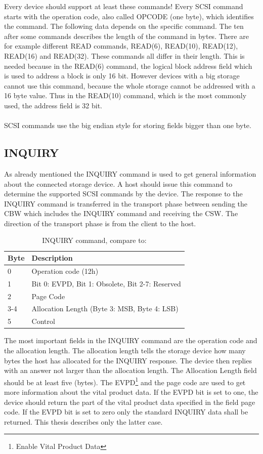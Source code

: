 Every device should support at least these commands! Every SCSI command starts with the operation code, also called OPCODE (one byte), which identifies the command. The following data depends on the specific command. The ten after some commands describes the length of the command in bytes. There are for example different READ commands, READ(6), READ(10), READ(12), READ(16) and READ(32)\cite{scsi_seagate}. These commands all differ in their length. This is needed because in the READ(6) command, the logical block address field which is used to address a block is only 16 bit. However devices with a big storage cannot use this command, because the whole storage cannot be addressed with a 16 byte value. Thus in the READ(10) command, which is the most commonly used, the address field is 32 bit.\\\\
SCSI commands use the big endian style for storing fields bigger than one byte.

\subsection{INQUIRY}

As already mentioned the INQUIRY command is used to get general information about the connected storage device. A host should issue this command to determine the supported SCSI commands by the device. The response to the INQUIRY command is transferred in the transport phase between sending the CBW which includes the INQUIRY command and receiving the CSW. The direction of the transport phase is from the client to the host.

\begin{table}[ht]
\caption{INQUIRY command, compare to: \cite{scsi_seagate}}
\centering
\begin{tabular}{|l|l|}
\hline\hline
\textbf{Byte} & \textbf{Description}\\ \hline
0 & Operation code (12h) \\ \hline
1 & Bit 0: EVPD, Bit 1: Obsolete, Bit 2-7: Reserved\\ \hline
2 & Page Code \\ \hline
3-4 & Allocation Length (Byte 3: MSB, Byte 4: LSB) \\ \hline
5 & Control \\ \hline
\end{tabular}
\label{table:inquiry}
\end{table}

The most important fields in the INQUIRY command are the operation code and the allocation length. The allocation length tells the storage device how many bytes the host has allocated for the INQUIRY response. The device then replies with an answer not larger than the allocation length. The Allocation Length field should be at least five (bytes). The EVPD\footnote{Enable Vital Product Data} and the page code are used to get more information about the vital product data. If the EVPD bit is set to one, the device should return the part of the vital product data specified in the field page code. If the EVPD bit is set to zero only the standard INQUIRY data shall be returned\cite{scsi_seagate}. This thesis describes only the latter case.

